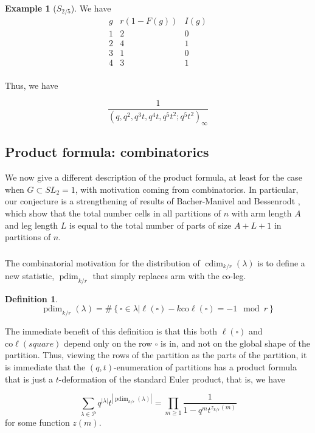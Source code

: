 \documentclass{amsart}[12pt]
\theoremstyle{definition}
\newtheorem{example}[dummy]{Example}
\newtheorem{definition}[dummy]{Definition}
\newcommand{\PP}{\mathcal{P}} %
\newcommand{\coleg}{\text{co}\ell}
\DeclareMathOperator{\dusty}{pdim}
\DeclareMathOperator{\cdim}{cdim}
\begin{document}
\begin{example}[$S_{2/5}$]
We have
$$\begin{array}{r|c|l}
g & r(1-F(g)) & I(g) \\
\hline
1 & 2 & 0 \\
2 & 4 & 1 \\
3 & 1 & 0 \\
4 & 3 & 1 \\
\end{array}
$$

Thus, we have


$$
\frac{1}{(q, q^2,q^3t, q^4t, q^5t^2; q^5t^2)_\infty}
$$
\end{example}


\subsection{Product formula: combinatorics}
\label{sec:prod-comb}

We now give a different description of the product formula, at least for the case when $G\subset SL_2=1$, with motivation coming from combinatorics.  In particular, our conjecture is a strengthening of results of Bacher-Manivel \cite{BM} and Bessenrodt \cite{Bess}, which show that the total number cells in all partitions of $n$ with arm length $A$ and leg length $L$ is equal to the total number of parts of size $A+L+1$ in partitions of $n$.

\subsubsection{ }

The combinatorial motivation for the distribution of $\cdim_{k/r}(\lambda)$ is to define a new statistic, $\dusty_{k/r}$ that simply replaces arm with the co-leg.
\begin{definition}
$$\dusty_{k/r}(\lambda)=\#\left\{\square\in\lambda\Big| \ell(\square)-k\coleg(\square)=-1\mod r\right\}$$
\end{definition}

The immediate benefit of this definition is that this both $\ell(\square)$ and $\coleg(square)$ depend only on the row $\square$ is in, and not on the global shape of the partition.  Thus, viewing the rows of the partition as the parts of the partition, it is immediate that the $(q,t)$-enumeration of partitions has a product formula that is just a $t$-deformation of the standard Euler product, that is, we have

$$\sum_{\lambda\in \PP} q^{|\lambda|} t^{|\dusty_{k/r}(\lambda)|}=\prod_{m\geq 1} \frac{1}{1-q^mt^{z_{k/r}(m)}}$$
for some function $z(m)$.
\end{document}
